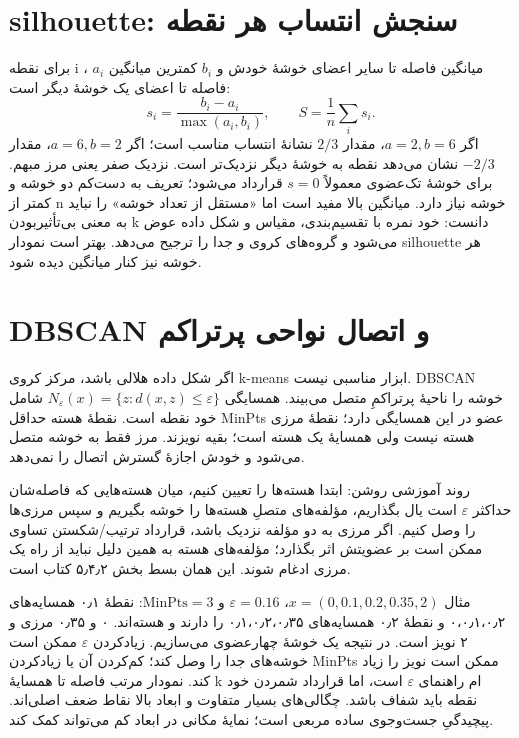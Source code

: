 \section{silhouette: سنجش انتساب هر نقطه}

برای نقطه i ، \(a_i\) میانگین فاصله تا سایر اعضای خوشهٔ خودش و \(b_i\) کمترین میانگین فاصله تا اعضای یک خوشهٔ دیگر است: \[
s_i=\frac{b_i-a_i}{\max(a_i,b_i)},\qquad S=\frac1n\sum_i s_i.
\] اگر \(a=2,b=6\)، مقدار \(2/3\) نشانهٔ انتساب مناسب است؛ اگر \(a=6,b=2\)، مقدار \(-2/3\) نشان می‌دهد نقطه به خوشهٔ دیگر نزدیک‌تر است. نزدیک صفر یعنی مرز مبهم. برای خوشهٔ تک‌عضوی معمولاً $s=0$ قرارداد می‌شود؛ تعریف به دست‌کم دو خوشه و کمتر از n خوشه نیاز دارد. میانگین بالا مفید است اما «مستقل از تعداد خوشه» را نباید به معنی بی‌تأثیربودن k دانست: خود نمره با تقسیم‌بندی، مقیاس و شکل داده عوض می‌شود و گروه‌های کروی و جدا را ترجیح می‌دهد. بهتر است نمودار silhouette هر خوشه نیز کنار میانگین دیده شود.

\section{DBSCAN و اتصال نواحی پرتراکم}

اگر شکل داده هلالی باشد، مرکز کروی k-means ابزار مناسبی نیست. DBSCAN خوشه را ناحیهٔ پرتراکمِ متصل می‌بیند. همسایگی \(N_\varepsilon(x)=\{z:d(x,z)\le\varepsilon\}\) شامل خود نقطه است. نقطهٔ هسته حداقل MinPts عضو در این همسایگی دارد؛ نقطهٔ مرزی هسته نیست ولی همسایهٔ یک هسته است؛ بقیه نویزند. مرز فقط به خوشه متصل می‌شود و خودش اجازهٔ گسترش اتصال را نمی‌دهد.

روند آموزشی روشن: ابتدا هسته‌ها را تعیین کنیم، میان هسته‌هایی که فاصله‌شان حداکثر $\varepsilon$ است یال بگذاریم، مؤلفه‌های متصلِ هسته‌ها را خوشه بگیریم و سپس مرزی‌ها را وصل کنیم. اگر مرزی به دو مؤلفه نزدیک باشد، قرارداد ترتیب/شکستن تساوی ممکن است بر عضویتش اثر بگذارد؛ مؤلفه‌های هسته به همین دلیل نباید از راه یک مرزی ادغام شوند. این همان بسط بخش ۵٫۴٫۲ کتاب است.

مثال \(x=(0,0.1,0.2,0.35,2)\)، $\varepsilon=0.16$ و $\mathrm{MinPts}=3$: نقطهٔ ۰٫۱ همسایه‌های ۰،۰٫۱،۰٫۲ و نقطهٔ ۰٫۲ همسایه‌های ۰٫۱،۰٫۲،۰٫۳۵ را دارند و هسته‌اند. ۰ و ۰٫۳۵ مرزی و ۲ نویز است. در نتیجه یک خوشهٔ چهارعضوی می‌سازیم. زیادکردن $\varepsilon$ ممکن است خوشه‌های جدا را وصل کند؛ کم‌کردن آن یا زیادکردن MinPts ممکن است نویز را زیاد کند. نمودار مرتب فاصله تا همسایهٔ k ام راهنمای $\varepsilon$ است، اما قرارداد شمردن خود نقطه باید شفاف باشد. چگالی‌های بسیار متفاوت و ابعاد بالا نقاط ضعف اصلی‌اند. پیچیدگیِ جست‌وجوی ساده مربعی است؛ نمایهٔ مکانی در ابعاد کم می‌تواند کمک کند.

